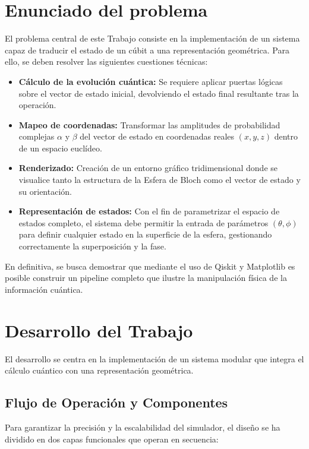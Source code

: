 \documentclass[11pt,a4paper,spanish]{book}
\begin{document}
\chapter{Enunciado del problema}

El problema central de este Trabajo consiste en la implementación de un sistema capaz de traducir el estado de un cúbit a una representación geométrica. Para ello, se deben resolver las siguientes cuestiones técnicas:

\begin{itemize}
    \item \textbf{Cálculo de la evolución cuántica:} Se requiere aplicar puertas lógicas sobre el vector de estado inicial, devolviendo el estado final resultante tras la operación.
    \item \textbf{Mapeo de coordenadas:} Transformar las amplitudes de probabilidad complejas $\alpha$ y $\beta$ del vector de estado en coordenadas reales $(x, y, z)$ dentro de un espacio euclídeo.
    \item \textbf{Renderizado:} Creación de un entorno gráfico tridimensional donde se visualice tanto la estructura de la Esfera de Bloch como el vector de estado y su orientación.
    \item \textbf{Representación de estados:} Con el fin de parametrizar el espacio de estados completo, el sistema debe permitir la entrada de parámetros $(\theta, \phi)$ para definir cualquier estado en la superficie de la esfera, gestionando correctamente la superposición y la fase.
\end{itemize}

En definitiva, se busca demostrar que mediante el uso de Qiskit y Matplotlib es posible construir un pipeline completo que ilustre la manipulación física de la información cuántica.


\chapter{Desarrollo del Trabajo}

El desarrollo se centra en la implementación de un sistema modular que integra el cálculo cuántico con una representación geométrica.

\section{Flujo de Operación y Componentes}
Para garantizar la precisión y la escalabilidad del simulador, el diseño se ha dividido en dos capas funcionales que operan en secuencia:
\end{document}
